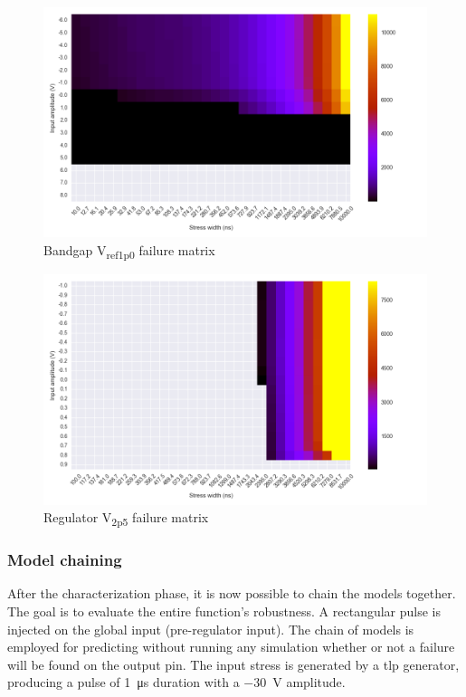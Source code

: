 \begin{figure}[!h]
  \centering
  \includegraphics[width=\textwidth]{src/4/figures/bandgap_cz.png}
  \caption{Bandgap V\textsubscript{ref1p0} failure matrix}
  \label{bandgap_wb}
\end{figure}

\begin{figure}[!h]
  \centering
  \includegraphics[width=\textwidth]{src/4/figures/regulator_cz.png}
  \caption{Regulator V\textsubscript{2p5} failure matrix}
  \label{regu_wb}
\end{figure}

\subsubsection{Model chaining}

After the characterization phase, it is now possible to chain the models together.
The goal is to evaluate the entire function's robustness.
A rectangular pulse is injected on the global input (pre-regulator input).
The chain of models is employed for predicting without running any simulation whether or not a failure will be found on the output pin.
The input stress is generated by a \gls{tlp} generator, producing a pulse of \SI{1}{\micro\second} duration with a \SI{-30}{\volt} amplitude.

